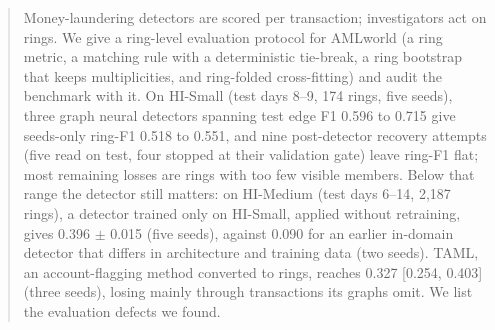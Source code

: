 \begin{abstract}
Money-laundering detectors are scored per transaction; investigators act on rings. We
give a ring-level evaluation protocol for AMLworld (a ring metric, a matching rule with a
deterministic tie-break, a ring bootstrap that keeps multiplicities, and ring-folded
cross-fitting) and audit the benchmark with it. On HI-Small (test days 8--9, 174 rings, five
seeds), three graph neural detectors spanning test edge F1 0.596 to 0.715 give seeds-only
ring-F1 0.518 to 0.551, and nine post-detector recovery attempts (five read on test, four
stopped at their validation gate) leave ring-F1 flat; most remaining losses are rings with too
few visible members. Below that range the detector still matters: on HI-Medium
(test days 6--14, 2{,}187 rings), a detector trained only on HI-Small, applied without
retraining, gives 0.396 $\pm$ 0.015 (five seeds), against 0.090 for an earlier in-domain detector
that differs in architecture and training data (two seeds). TAML, an account-flagging method
converted to rings, reaches 0.327 [0.254, 0.403] (three seeds), losing mainly through
transactions its graphs omit. We list the evaluation defects we found.
\end{abstract}
